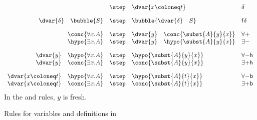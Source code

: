 \begin{marginfigure}
  $$
  \begin{array}{rcll}
    &\step &\dvar{x \coloneq t} &\delta \\[1em]

    \dvar{\delta}~~~{\bubble{S}} &\step &\bubble{\dvar{\delta}~~~S} &\mathsf{f}\delta \\[1em]

    \conc{\forall x. A} &\step &\dvar{y}~~~\conc{\subst{A}{y}{x}} &\forall{+} \\
    \hypo{\exists x. A} &\step &\dvar{y}~~~\hypo{\subst{A}{y}{x}} &\exists{-} \\[1em]

    \dvar{y}~~~{\hypo{\forall x. A}} &\step &\hypo{\subst{A}{y}{x}} &\forall{-}\mathsf{h} \\
    \dvar{y}~~~{\conc{\exists x. A}} &\step &\conc{\subst{A}{y}{x}} &\exists{+}\mathsf{h} \\[1em]

    \dvar{x \coloneq t}~~~{\hypo{\forall x. A}} &\step &\hypo{\subst{A}{t}{x}} &\forall{-}\mathsf{b} \\
    \dvar{x \coloneq t}~~~{\conc{\exists x. A}} &\step &\conc{\subst{A}{t}{x}} &\exists{+}\mathsf{b} \\
  \end{array}
  $$
  In the {\rnm{\forall{+}}} and {\rnm{\exists{-}}} rules, $y$ is fresh.
  \caption{Rules for variables and definitions in }
\end{marginfigure}


